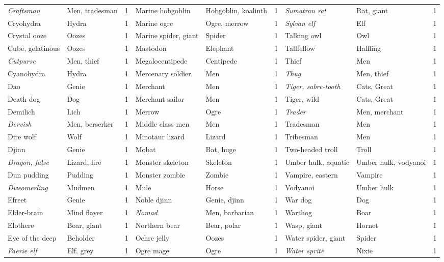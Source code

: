 \documentclass[../main.tex]{subfiles}
\begin{document}
\begin{table}[H]
{\begin{tabular}{llcllcllc}
\textit{Craftsman} & Men, tradesman & 1 & Marine hobgoblin & Hobgoblin, koalinth & 1 & \textit{Sumatran rat} & Rat, giant & 1 \\
Cryohydra & Hydra & 1 & Marine ogre & Ogre, merrow & 1 & \textit{Sylvan elf} & Elf & 1 \\
Crystal ooze & Oozes & 1 & Marine spider, giant & Spider & 1 & Talking owl & Owl & 1 \\
Cube, gelatinous & Oozes & 1 & Mastodon & Elephant & 1 & Tallfellow & Halfling & 1 \\
\textit{Cutpurse} & Men, thief & 1 & Megalocentipede & Centipede & 1 & Thief & Men & 1 \\
Cyanohydra & Hydra & 1 & Mercenary soldier & Men & 1 & \textit{Thug} & Men, thief & 1 \\
Dao & Genie & 1 & Merchant & Men & 1 & \textit{Tiger, sabre-tooth} & Cats, Great & 1 \\
Death dog & Dog & 1 & Merchant sailor & Men & 1 & Tiger, wild & Cats, Great & 1 \\
Demilich & Lich & 1 & Merrow & Ogre & 1 & \textit{Trader} & Men, merchant & 1 \\
\textit{Dervish} & Men, berserker & 1 & Middle class men & Men & 1 & Tradesman & Men & 1 \\
Dire wolf & Wolf & 1 & Minotaur lizard & Lizard & 1 & Tribesman & Men & 1 \\
Djinn & Genie & 1 & Mobat & Bat, huge & 1 & Two-headed troll & Troll & 1 \\
\textit{Dragon, false} & Lizard, fire & 1 & Monster skeleton & Skeleton & 1 & Umber hulk, aquatic & Umber hulk, vodyanoi & 1 \\
Dun pudding & Pudding & 1 & Monster zombie & Zombie & 1 & Vampire, eastern & Vampire & 1 \\
\textit{Dweomerling} & Mudmen & 1 & Mule & Horse & 1 & Vodyanoi & Umber hulk & 1 \\
Efreet & Genie & 1 & Noble djinn & Genie, djinn & 1 & War dog & Dog & 1 \\
Elder-brain & Mind flayer & 1 & \textit{Nomad} & Men, barbarian & 1 & Warthog & Boar & 1 \\
Elothere & Boar, giant & 1 & Northern bear & Bear, polar & 1 & Wasp, giant & Hornet & 1 \\
Eye of the deep & Beholder & 1 & Ochre jelly & Oozes & 1 & Water spider, giant & Spider & 1 \\
\textit{Faerie elf} & Elf, grey & 1 & Ogre mage & Ogre & 1 & \textit{Water sprite} & Nixie & 1 \\

\end{tabular}}
\end{table}
\end{document}

